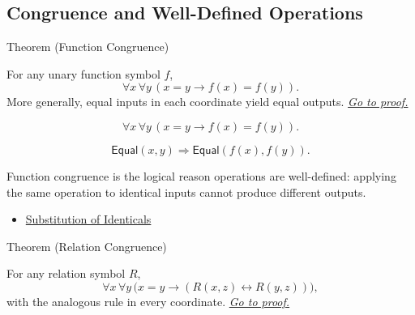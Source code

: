 \subsection{Congruence and Well-Defined Operations}

\begin{theorembox}{Theorem (Function Congruence)}
\begin{theorem}\label{thm:axiomatic-equality-function-congruence}
For any unary function symbol \(f\),
\[
  \forall x\,\forall y\,(x=y\to f(x)=f(y)).
\]
More generally, equal inputs in each coordinate yield equal outputs.
\hyperref[prf:axiomatic-equality-function-congruence]{\textit{Go to proof.}}
\end{theorem}
\end{theorembox}

\begin{remark*}
\[
  \forall x\,\forall y\,(x=y\to f(x)=f(y)).
\]
\end{remark*}

\begin{remark*}
\[
  \mathsf{Equal}(x,y)\Longrightarrow \mathsf{Equal}(f(x),f(y)).
\]
\end{remark*}

\begin{remark*}[Interpretation]
Function congruence is the logical reason operations are well-defined: applying
the same operation to identical inputs cannot produce different outputs.
\end{remark*}


\begin{dependencies}
\begin{itemize}
  \item \hyperref[ax:axiomatic-equality-substitution]{Substitution of Identicals}
\end{itemize}
\end{dependencies}

\begin{theorembox}{Theorem (Relation Congruence)}
\begin{theorem}\label{thm:axiomatic-equality-relation-congruence}
For any relation symbol \(R\),
\[
  \forall x\,\forall y\,
  \bigl(x=y\to(R(x,z)\leftrightarrow R(y,z))\bigr),
\]
with the analogous rule in every coordinate.
\hyperref[prf:axiomatic-equality-relation-congruence]{\textit{Go to proof.}}
\end{theorem}
\end{theorembox}


